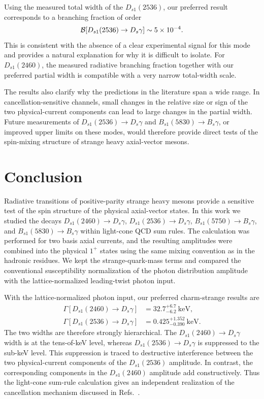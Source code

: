\documentclass[aps,prd,preprint,nofootinbib,superscriptaddress]{revtex4-2}
\newcommand{\Ds}{D_s}
\newcommand{\Dsone}{D_{s1}}
\newcommand{\Bs}{B_s}
\newcommand{\Bsone}{B_{s1}}
\newcommand{\keV}{\mathrm{keV}}
\begin{document}
Using the measured total width of the $\Dsone(2536)$, our preferred result
corresponds to a branching fraction of order
\begin{equation}
  {\cal B}[\Dsone(2536)\to\Ds\gamma]
  \sim 5\times10^{-4}.
  \label{eq:br-ds12536}
\end{equation}
This is consistent with the absence of a clear experimental signal for this
mode and provides a natural explanation for why it is difficult to isolate.
For $\Dsone(2460)$, the measured radiative branching fraction together with our
preferred partial width is compatible with a very narrow total-width scale.

The results also clarify why the predictions in the literature span a wide
range.  In cancellation-sensitive channels, small changes in the relative size
or sign of the two physical-current components can lead to large changes in
the partial width.  Future measurements of
$\Dsone(2536)\to\Ds\gamma$ and $\Bsone(5830)\to\Bs\gamma$, or improved upper
limits on these modes, would therefore provide direct tests of the spin-mixing
structure of strange heavy axial-vector mesons.


\section{Conclusion}
\label{sec:concl}

Radiative transitions of positive-parity strange heavy mesons provide a
sensitive test of the spin structure of the physical axial-vector states.  In
this work we studied the decays
$\Dsone(2460)\to\Ds\gamma$, $\Dsone(2536)\to\Ds\gamma$,
$\Bsone(5750)\to\Bs\gamma$, and $\Bsone(5830)\to\Bs\gamma$
within light-cone QCD sum rules.  The calculation was performed for two basis
axial currents, and the resulting amplitudes were combined into the physical
$1^+$ states using the same mixing convention as in the hadronic residues.  We
kept the strange-quark-mass terms and compared the conventional
susceptibility normalization of the photon distribution amplitude with the
lattice-normalized leading-twist photon input.

With the lattice-normalized photon input, our preferred charm-strange results
are
\begin{align}
  \Gamma[\Dsone(2460)\to\Ds\gamma]
  &=
  32.7^{+6.7}_{-6.2}~\keV,
  \\
  \Gamma[\Dsone(2536)\to\Ds\gamma]
  &=
  0.425^{+1.352}_{-0.390}~\keV .
\end{align}
The two widths are therefore strongly hierarchical.  The
$\Dsone(2460)\to\Ds\gamma$ width is at the tens-of-keV level, whereas
$\Dsone(2536)\to\Ds\gamma$ is suppressed to the sub-keV level.  This
suppression is traced to destructive interference between the two
physical-current components of the $\Dsone(2536)$ amplitude.  In contrast, the
corresponding components in the $\Dsone(2460)$ amplitude add constructively.
Thus the light-cone sum-rule calculation gives an independent realization of
the cancellation mechanism discussed in Refs.~\cite{Bondar:2023mua,
Bondar:2025smw}.
\end{document}
